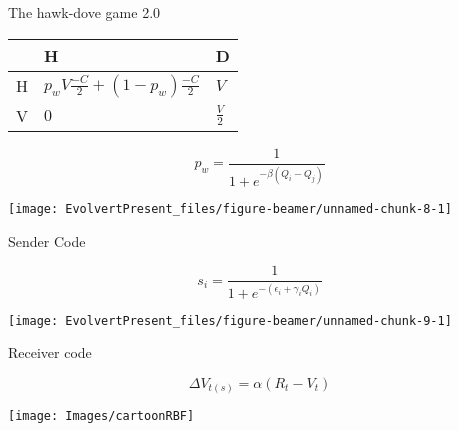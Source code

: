 \documentclass[
  ignorenonframetext,
]{beamer}
\begin{document}
\begin{frame}{The hawk-dove game 2.0}
\protect\hypertarget{the-hawk-dove-game-2.0}{}

\begin{center}
\begin{tabular}{ >{\centering\arraybackslash}p{1cm} | >{\centering\arraybackslash}p{4.5cm} | >{\centering\arraybackslash}p{4.5cm} }
& H & D \\ \hline
H & $p_w V\frac{-C}{2} + (1-p_w) \frac{-C}{2}$ & $V$ \\ \hline
V & $0$ & $\frac{V}{2}$\\
\end{tabular}
\end{center}

\begin{equation*}
p_w=\frac{1}{1+e^{-\beta(Q_i-Q_j)}}
\end{equation*}

\begin{center}\texttt{[image: EvolvertPresent\_files/figure-beamer/unnamed-chunk-8-1]} \end{center}

\end{frame}

\begin{frame}{Sender Code}
\protect\hypertarget{sender-code}{}

\begin{equation*}
s_i = \frac{1}{1+e^{-(\epsilon_i+\gamma_iQ_i)}}
\label{eq:react_norm}
\end{equation*}

\begin{center}\texttt{[image: EvolvertPresent\_files/figure-beamer/unnamed-chunk-9-1]} \end{center}

\end{frame}

\begin{frame}{Receiver code}
\protect\hypertarget{receiver-code}{}

\begin{equation*}
  \Delta V_{t(s)}=\alpha (R_t-V_t)
\end{equation*}

\begin{center}\texttt{[image: Images/cartoonRBF]} \end{center}

\end{frame}
\end{document}
